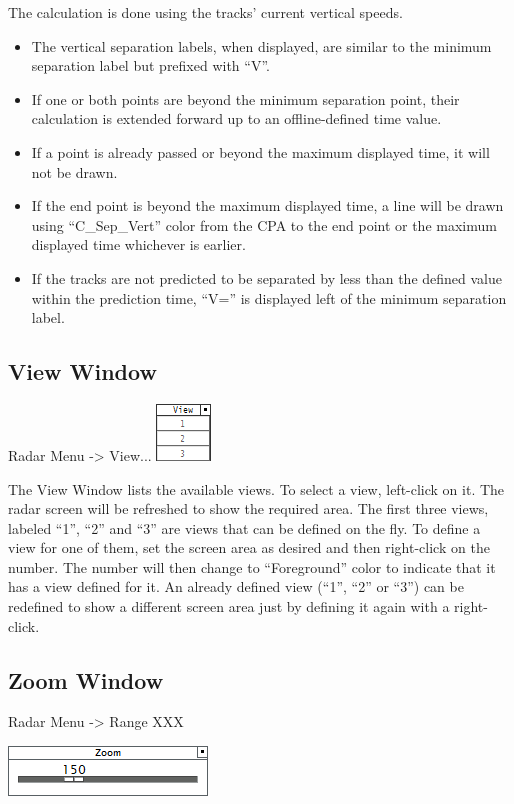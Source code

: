 \documentclass[11pt,a4paper]{memoir}
\begin{document}
The calculation is done using the tracks’ current vertical speeds.

\begin{itemize}
    \item The vertical separation labels, when displayed, are similar to the minimum separation label but prefixed with “V”.
    \item If one or both points are beyond the minimum separation point, their calculation is extended forward up to an offline-defined time value.
    \item If a point is already passed or beyond the maximum displayed time, it will not be drawn.
    \item If the end point is beyond the maximum displayed time, a line will be drawn using “C\_Sep\_Vert” color from the CPA to the end point or the maximum displayed time whichever is earlier.
    \item If the tracks are not predicted to be separated by less than the defined value within the prediction time, “V=” is displayed left of the minimum separation label.
\end{itemize}

\subsection{View Window}
\label{win:view}
Radar Menu -> View...
\includegraphics{img/viewmenu.png}

The View Window lists the available views. To select a view, left-click on it. The radar screen will be refreshed to show the required area. The first three views, labeled “1”, “2” and “3” are views that can be defined on the fly. To define a view for one of them, set the screen area as desired and then right-click on the number. The number will then change to “Foreground” color to indicate that it has a view defined for it. An already defined view (“1”, “2” or “3”) can be redefined to show a different screen area just by defining it again with a right-click.

\subsection{Zoom Window}
\label{win:zoom}
Radar Menu -> Range XXX

\includegraphics{img/zoom.png}
\end{document}
